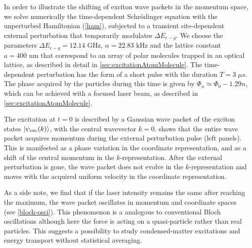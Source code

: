 In order to illustrate the shifting of exciton wave packets in the
momentum space, we solve numerically the time-dependent
Schr\"{o}dinger equation with the unperturbed Hamiltonian
(\ref{ham}),  subjected to a transient site-dependent external
perturbation that temporarily modulates $\Delta E_{e-g}$.
We choose the parameters $\Delta E_{e-g} =12.14\mbox{ GHz}$, $\alpha =22.83\mbox{ kHz}$ and the lattice constant $a=400\mbox{ nm}$ that correspond to an array of
polar molecules trapped in an optical lattice, as described in detail in \autoref{sec:excitationAtomMolecule}.
The time-dependent perturbation has the form of a short pulse with the duration $T = 3\; \mu s$. %
The phase acquired by the particles during this time is given by $\Phi_n \simeq \Phi_0  -1.29 n $, which can be achieved with a focused laser beam, as described in \autoref{sec:excitationAtomMolecule}.



The excitation at $t=0$ is described by
a Gaussian wave packet of the exciton states $|\psi_{\rm
exc}(k)\rangle$, with the central wavevector $k=0$.
 shows that the
entire wave packet acquires momentum during the external perturbation pulse (left
panels). This is manifested as a phase variation in the coordinate
representation, and as a shift of the central momentum in the
$k$-representation. After the external perturbation is gone, the
wave packet does not evolve in the $k$-representation and moves
with the acquired uniform velocity in the coordinate
representation.

As a side note, we find that if the laser intensity remains the
same after reaching the maximum, the wave packet oscillates in momentum and coordinate spaces (see 
\autoref{bloch-osci}). This phenomenon is a analogous to conventional Bloch oscillations although here
 the force is acting on a quasi-particle rather than real
particles\cite{b-oscillation}. This suggests a possibility to study condensed-matter excitations and energy transport without statistical averaging.


